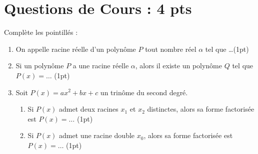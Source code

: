 \documentclass[12pt,a4paper]{article}
\begin{document}
\renewcommand{\arraystretch}{1.5}
\renewcommand{\arrayrulewidth}{1.2pt}
\vspace{3cm}

\section*{Questions de Cours : 4 pts}
Complète les pointillés :
\begin{enumerate}
    \item On appelle racine réelle d’un polynôme \( P \) tout nombre réel \( \alpha \) tel que \ldots \hfill (1pt)
    \item Si un polynôme \( P \) a une racine réelle \( \alpha \), alors il existe un polynôme \( Q \) tel que \( P(x) = \ldots \) \hfill (1pt)
    \item Soit \( P(x) = ax^2 + bx + c \) un trinôme du second degré.
        \begin{enumerate}
            \item Si \( P(x) \) admet deux racines \( x_1 \) et \( x_2 \) distinctes, alors sa forme factorisée est \( P(x) = \ldots \) \hfill (1pt)
            \item Si \( P(x) \) admet une racine double \( x_0 \), alors sa forme factorisée est \( P(x) = \ldots \) \hfill (1pt)
        \end{enumerate}
\end{enumerate}
\end{document}
